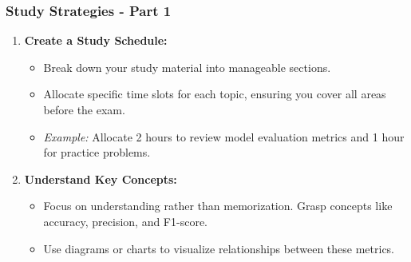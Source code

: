 \documentclass[aspectratio=169]{beamer}
\begin{document}
\begin{frame}[fragile]
    \frametitle{Study Strategies - Part 1}
    \begin{enumerate}
        \item \textbf{Create a Study Schedule:}
            \begin{itemize}
                \item Break down your study material into manageable sections.
                \item Allocate specific time slots for each topic, ensuring you cover all areas before the exam.
                \item \textit{Example:} Allocate 2 hours to review model evaluation metrics and 1 hour for practice problems.
            \end{itemize}

        \item \textbf{Understand Key Concepts:}
            \begin{itemize}
                \item Focus on understanding rather than memorization. Grasp concepts like accuracy, precision, and F1-score.
                \item Use diagrams or charts to visualize relationships between these metrics.
            \end{itemize}
    \end{enumerate}
\end{frame}
\end{document}
